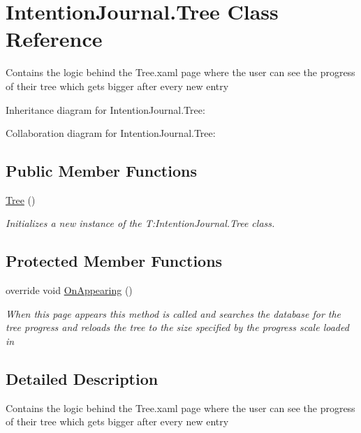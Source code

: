 \hypertarget{class_intention_journal_1_1_tree}{}\section{Intention\+Journal.\+Tree Class Reference}
\label{class_intention_journal_1_1_tree}


Contains the logic behind the Tree.\+xaml page where the user can see the progress of their tree which gets bigger after every new entry  




Inheritance diagram for Intention\+Journal.\+Tree\+:


Collaboration diagram for Intention\+Journal.\+Tree\+:
\subsection*{Public Member Functions}
\begin{DoxyCompactItemize}
\item 
\hyperlink{class_intention_journal_1_1_tree_ac27cc906417eb430c730500fddee785c}{Tree} ()
\begin{DoxyCompactList}\small\item\em Initializes a new instance of the T\+:\+Intention\+Journal.\+Tree class. \end{DoxyCompactList}\end{DoxyCompactItemize}
\subsection*{Protected Member Functions}
\begin{DoxyCompactItemize}
\item 
override void \hyperlink{class_intention_journal_1_1_tree_a0d34416eb58cf86e6fe4e41193b58666}{On\+Appearing} ()
\begin{DoxyCompactList}\small\item\em When this page appears this method is called and searches the database for the tree progress and reloads the tree to the size specified by the progress scale loaded in \end{DoxyCompactList}\end{DoxyCompactItemize}


\subsection{Detailed Description}
Contains the logic behind the Tree.\+xaml page where the user can see the progress of their tree which gets bigger after every new entry 



